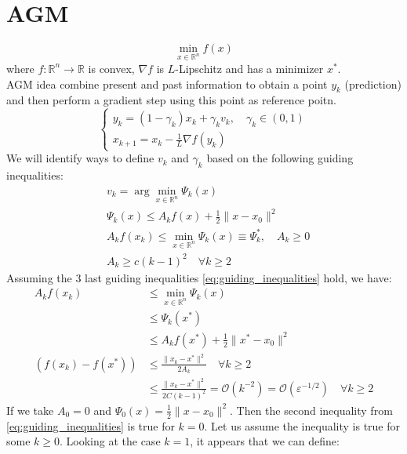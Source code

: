 \documentclass[12pt, openany]{report}
\newcommand{\R}{\mathbb{R}}
\renewcommand{\O}{\mathcal{O}}
\theoremstyle{definition}
\begin{document}
\chapter{AGM}
\begin{equation}
	\min_{x \in \R^n} f(x) 
\end{equation}
where $f: \R^n \to \R$ is convex, $\nabla f$ is $L$-Lipschitz and has a minimizer $x^*$.\\
AGM idea combine present and past information to obtain a point $y_k$ (prediction) and then perform a gradient step using this point as reference poitn.\\
\begin{equation}
	\begin{cases}
		y_k = (1-\gamma_k)x_k + \gamma_k v_k, \quad \gamma_k \in (0,1)\\
		x_{k+1} = x_k - \frac{1}{L} \nabla f(y_k)
	\end{cases}
\end{equation}
We will identify ways to define $v_k$ and $\gamma_k$ based on the following guiding inequalities:
\begin{equation}\label{eq:guiding_inequalities}
	\begin{aligned}
		&v_k = \arg \min_{x \in \R^n} \Psi_k (x)\\
		&\Psi_k (x) \leq A_k f(x) + \frac{1}{2} \|x-x_0\|^2\\
		&A_k f(x_k) \leq \min_{x \in \R^n} \Psi_k (x) \equiv \Psi_k^*, \quad A_k \geq 0\\
		&A_k \geq c(k-1)^2 \quad \forall k \geq 2
	\end{aligned}
\end{equation}
Assuming the 3 last guiding inequalities \eqref{eq:guiding_inequalities} hold, we have:
\begin{equation}
	\begin{aligned}
		A_kf(x_k) &\leq \min_{x \in \R^n} \Psi_k (x)\\
		&\leq \Psi_k(x^*)\\
		&\leq A_k f(x^*) + \frac{1}{2} \|x^*-x_0\|^2\\
		\left(f(x_k)-f(x^*)\right) &\leq \frac{\|x_k-x^*\|^2}{2 A_k} \quad \forall k \geq 2\\
		&\leq \frac{\|x_k-x^*\|^2}{2 C(k-1)^2} = \O(k^{-2}) = \O(\varepsilon^{-1/2}) \quad \forall k \geq 2
	\end{aligned}
\end{equation}
If we take $A_0=0$ and $\Psi_0(x) = \frac{1}{2} \|x-x_0\|^2$. Then the second inequality from \eqref{eq:guiding_inequalities} is true for $k=0$. Let us assume the inequality is true for some $k \geq 0$. Looking at the case $k=1$, it appears that we can define:
\end{document}
